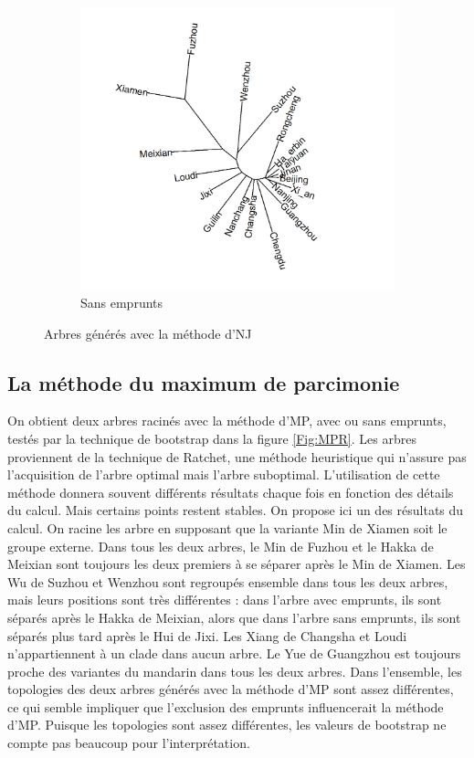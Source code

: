 \documentclass{scrbook}
\newcounter{c}[subsubsection]
\begin{document}
\begin{sloppypar}
\begin{figure}[htbp]
\begin{subfigure}{.5\textwidth}
\includegraphics[scale=.3]{Figure/NJ_without}
\caption{Sans emprunts}
\end{subfigure}
\caption{Arbres générés avec la méthode d'NJ}
\label{Fig:NJ}
\end{figure}

\subsection{La méthode du maximum de parcimonie}
On obtient deux arbres racinés avec la méthode d'MP, avec ou sans emprunts, testés par la technique de bootstrap dans la figure \ref{Fig:MPR}. Les arbres proviennent de la technique de Ratchet, une méthode heuristique qui n'assure pas l'acquisition de l'arbre optimal mais l'arbre suboptimal. L'utilisation de cette méthode donnera souvent différents résultats chaque fois en fonction des détails du calcul. Mais certains points restent stables. On propose ici un des résultats du calcul. On racine les arbre en supposant que la variante Min de Xiamen soit le groupe externe. Dans tous les deux arbres, le Min de Fuzhou et le Hakka de Meixian sont toujours les deux premiers à se séparer après le Min de Xiamen. Les Wu de Suzhou et Wenzhou sont regroupés ensemble dans tous les deux arbres, mais leurs positions sont très différentes : dans l'arbre avec emprunts, ils sont séparés après le Hakka de Meixian, alors que dans l'arbre sans emprunts, ils sont séparés plus tard après le Hui de Jixi. Les Xiang de Changsha et Loudi n'appartiennent à un clade dans aucun arbre. Le Yue de Guangzhou est toujours proche des variantes du mandarin dans tous les deux arbres. Dans l'ensemble, les topologies des deux arbres générés avec la méthode d'MP sont assez différentes, ce qui semble impliquer que l'exclusion des emprunts influencerait la méthode d'MP. Puisque les topologies sont assez différentes, les valeurs de bootstrap ne compte pas beaucoup pour l'interprétation.


\end{sloppypar}
\end{document}
